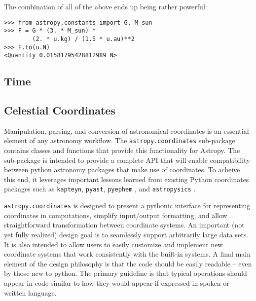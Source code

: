 \documentclass[traditabstract]{aa}
\begin{document}
The combination of all of the above ends up being rather powerful:
\begin{verbatim}
>>> from astropy.constants import G, M_sun
>>> F = G * (3. * M_sun) *
        (2. * u.kg) / (1.5 * u.au)**2
>>> F.to(u.N)
<Quantity 0.01581795428812989 N>
\end{verbatim}

\subsection{Time}



\subsection{Celestial Coordinates}



Manipulation, parsing, and conversion of astronomical coordinates is
an essential element of any astronomy workflow. The
\texttt{astropy.coordinates} sub-package contains classes and
functions that provide this functionality for Astropy. The sub-package
is intended to provide a complete API that will enable compatibility
between python astronomy packages that make use of coordinates.  To
acheive this end, it leverages important lessons learned from existing
Python coordinates packages such as \texttt{kapteyn}, \texttt{pyast},
\texttt{pyephem} \citep{pyephem}, and \texttt{astropysics}
\citep{astropysics}.

\texttt{astropy.coordinates} is designed to present a pythonic
interface for representing coordinates in computations, simplify
input/output formatting, and allow straightforward transformation
between coordinate systems.  An important (not yet fully realized)
design goal is to seamlessly support arbitrarily large data sets.  It
is also intended to allow users to easily customize and implement new
coordinate systems that work consistently with the built-in systems.
A final main element of the design philosophy is that the code should
be easily readable -- even by those new to python.  The primary
guideline is that typical operations should appear in code similar to
how they would appear if expressed in spoken or written language.
\end{document}
